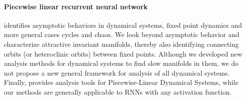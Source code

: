 \documentclass{article} %
\newcommand{\ascomment}[1]{\textcolor{ascolor}{(#1)}}
\newcounter{ct}
\theoremstyle{definition}
\theoremstyle{remark}
\begin{document}
\paragraph{Piecewise linear recurrent neural network}
\citep{schmidt2019identifying} identifies asymptotic behaviors in dynamical systems, fixed point dynamics and more general cases cycles and chaos.
We look beyond asymptotic behavior and characterize attractive invariant manifolds, thereby also identifying connecting orbits (or heteroclinic orbits) between fixed points.
Although we developed new analysis methods for dynamical systems to find slow manifolds in them, we do not propose a new general framework for analysis of all dynamical systems.
Finally, \citep{schmidt2019identifying} provides analysis tools for Piecewise-Linear Dynamical Systems, while our methods are generally applicable to RNNs with any activation function.



%
%

\end{document}
